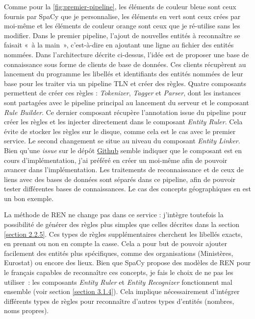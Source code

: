 Comme pour la \autoref{fig:premier-pipeline}, les éléments de couleur bleue sont ceux fournis par SpaCy que je personnalise, les éléments en vert sont ceux crées par moi-même et les éléments de couleur orange sont ceux que je ré-utilise sans les modifier. Dans le premier pipeline, l'ajout de nouvelles entités à reconnaître se faisait «~à la main~», c'est-à-dire en ajoutant une ligne au fichier des entités nommées. Dans l'architecture décrite ci-dessus, l'idée est de proposer une base de connaissance sous forme de clients de base de données. Ces clients récupèrent au lancement du programme les libellés et identifiants des entités nommées de leur base pour les traiter via un pipeline TLN et créer des règles. Quatre composants permettent de créer ces règles : \textit{Tokenizer}, \textit{Tagger} et \textit{Parser}, dont les instances sont partagées avec le pipeline principal au lancement du serveur et le composant \textit{Rule Builder}. Ce dernier composant récupère l'annotation issue du pipeline pour créer les règles et les injecter directement dans le composant \textit{Entity Ruler}. Cela évite de stocker les règles sur le disque, comme cela est le cas avec le premier service.
Le second changement se situe au niveau du composant \textit{Entity Linker}. Bien qu'une \textit{issue} sur le dépôt \href{https://github.com/explosion/spaCy/issues}{Github} \cite{spacy-repo} semble indiquer que le composant est en cours d'implémentation, j'ai préféré en créer un moi-même afin de pouvoir avancer dans l'implémentation. Les traitements de reconnaissance et de ceux de liens avec des bases de données sont séparés dans ce pipeline, afin de pouvoir tester différentes bases de connaissances. Le cas des concepts géographiques en est un bon exemple.
\newline

La méthode de REN ne change pas dans ce service : j'intègre toutefois la possibilité de générer des règles plus simples que celles décrites dans la section \ref{section 2.2.5}. Ces types de règles supplémentaires cherchent les libellés exacts, en prenant ou non en compte la casse. Cela a pour but de pouvoir ajouter facilement des entités plus spécifiques, comme des organisations (Ministères, Eurostat) ou encore des lieux. Bien que SpaCy propose des modèles de REN pour le français capables de reconnaître ces concepts, je fais le choix de ne pas les utiliser~: les composants \textit{Entity Ruler} et \textit{Entity Recognizer} fonctionnent mal ensemble (voir section \ref{section 3.1.4}). Cela implique nécessairement d'intégrer différents types de règles pour reconnaître d'autres types d'entités (nombres, noms propres). 
\newline

